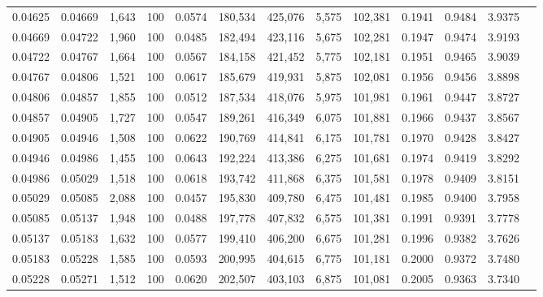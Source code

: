 \begin{tabular}{rrrrrrrrrrrrr}
0.04625 & 0.04669 & 1,643 & 100 &                                     0.0574 & 180,534 & 425,076 &   5,575 & 102,381 & 0.1941 & 0.9484 & 3.9375 \\
0.04669 & 0.04722 & 1,960 & 100 &                                     0.0485 & 182,494 & 423,116 &   5,675 & 102,281 & 0.1947 & 0.9474 & 3.9193 \\
0.04722 & 0.04767 & 1,664 & 100 &                                     0.0567 & 184,158 & 421,452 &   5,775 & 102,181 & 0.1951 & 0.9465 & 3.9039 \\
0.04767 & 0.04806 & 1,521 & 100 &                                     0.0617 & 185,679 & 419,931 &   5,875 & 102,081 & 0.1956 & 0.9456 & 3.8898 \\
0.04806 & 0.04857 & 1,855 & 100 &                                     0.0512 & 187,534 & 418,076 &   5,975 & 101,981 & 0.1961 & 0.9447 & 3.8727 \\
0.04857 & 0.04905 & 1,727 & 100 &                                     0.0547 & 189,261 & 416,349 &   6,075 & 101,881 & 0.1966 & 0.9437 & 3.8567 \\
0.04905 & 0.04946 & 1,508 & 100 &                                     0.0622 & 190,769 & 414,841 &   6,175 & 101,781 & 0.1970 & 0.9428 & 3.8427 \\
0.04946 & 0.04986 & 1,455 & 100 &                                     0.0643 & 192,224 & 413,386 &   6,275 & 101,681 & 0.1974 & 0.9419 & 3.8292 \\
0.04986 & 0.05029 & 1,518 & 100 &                                     0.0618 & 193,742 & 411,868 &   6,375 & 101,581 & 0.1978 & 0.9409 & 3.8151 \\
0.05029 & 0.05085 & 2,088 & 100 &                                     0.0457 & 195,830 & 409,780 &   6,475 & 101,481 & 0.1985 & 0.9400 & 3.7958 \\
0.05085 & 0.05137 & 1,948 & 100 &                                     0.0488 & 197,778 & 407,832 &   6,575 & 101,381 & 0.1991 & 0.9391 & 3.7778 \\
0.05137 & 0.05183 & 1,632 & 100 &                                     0.0577 & 199,410 & 406,200 &   6,675 & 101,281 & 0.1996 & 0.9382 & 3.7626 \\
0.05183 & 0.05228 & 1,585 & 100 &                                     0.0593 & 200,995 & 404,615 &   6,775 & 101,181 & 0.2000 & 0.9372 & 3.7480 \\
0.05228 & 0.05271 & 1,512 & 100 &                                     0.0620 & 202,507 & 403,103 &   6,875 & 101,081 & 0.2005 & 0.9363 & 3.7340 \\

\end{tabular}
